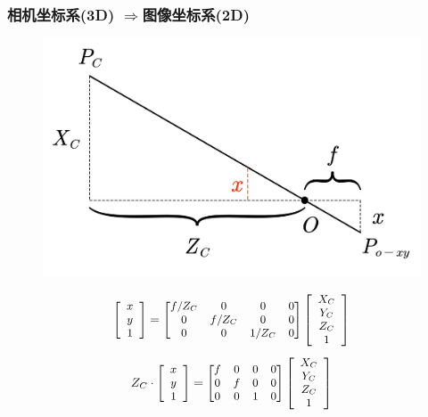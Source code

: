 \documentclass[aspectratio=43]{beamer}
\begin{document}
\begin{frame}
	\frametitle{相机坐标系(3D) $\Rightarrow$图像坐标系(2D)}
	\begin{figure}
		\begin{center}
			\includegraphics[scale=0.65]{小孔成像模型}
		\end{center}
	\end{figure}
	\begin{gather}
		{\small \left[ \begin{array}{c}
				x\\
				y\\
				1\\
			\end{array} \right] =\left[ \begin{matrix}
				f/Z_C&		0&		0&		0\\
				0&		f/Z_C&		0&		0\\
				0&		0&		1/Z_C&		0\\
			\end{matrix} \right] \left[ \begin{array}{c}
				X_C\\
				Y_C\\
				Z_C\\
				1\\
			\end{array} \right]   }	
	\end{gather}
	\begin{gather}
		{\small Z_C\cdot \left[ \begin{array}{c}
				x\\
				y\\
				1\\
			\end{array} \right] =\left[ \begin{matrix}
				f&		0&		0&		0\\
				0&		f&		0&		0\\
				0&		0&		1&		0\\
			\end{matrix} \right] \left[ \begin{array}{c}
				X_C\\
				Y_C\\
				Z_C\\
				1\\
			\end{array} \right]  }
	\end{gather}
\end{frame}
\end{document}
